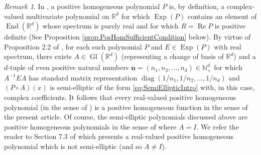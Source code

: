 \documentclass[11pt]{article}
\newenvironment{example}
  {\pushQED{\qed}\renewcommand{\qedsymbol}{$\triangle$}\examplex}
  {\popQED\endexamplex}
\theoremstyle{remark}
\newtheorem{remark}{Remark}
\renewcommand\Re{\operatorname{Re}}%
\newcommand\End{\operatorname{End}} %
\newcommand\Gl{\operatorname{Gl}} %
\newcommand\Exp{\operatorname{Exp}}
\newcommand\diag{\operatorname{diag}}
\begin{document}
\begin{example}
\begin{remark}
In \cite{randles_convolution_2017}, a positive homogeneous polynomial $P$ is, by definition, a complex-valued multivariate polynomial on $\mathbb{R}^d$ for which $\Exp(P)$ contains an element of $\End(\mathbb{R}^d)$ whose spectrum is purely real and for which $R=\Re P$ is positive definite (See Proposition \ref{prop:PosHomSufficientCondition} below). By virtue of Proposition 2.2 of \cite{randles_convolution_2017}, for each such polynomial $P$ and $E\in\Exp(P)$ with real spectrum, there exists $A\in\Gl(\mathbb{R}^d)$ (representing a change of basis of $\mathbb{R}^d$) and a $d$-tuple of even positive natural numbers $\mathbf{n}=(n_1,n_2,\dots,n_d)\in\mathbb{N}_+^d$ for which $A^{-1}EA$ has standard matrix representation $\diag(1/n_1,1/n_2,\dots,1/n_d)$ and $(P\circ A)(x)$ is semi-elliptic of the form \eqref{eq:SemiEllipticIntro} with, in this case, complex coefficients. It follows that every real-valued positive homogeneous polynomial (in the sense of \cite{randles_convolution_2017}) is a positive homogeneous function in the sense of the present article. Of course, the semi-elliptic polynomials discussed above are positive homogeneous polynomials in the sense of \cite{randles_convolution_2017} where $A=I$. We refer the reader to Section 7.3 of \cite{randles_convolution_2017} which presents a real-valued positive homogeneous polynomial which is not semi-elliptic (and so $A\neq I$).
\end{remark}
\end{example}
\end{document}
